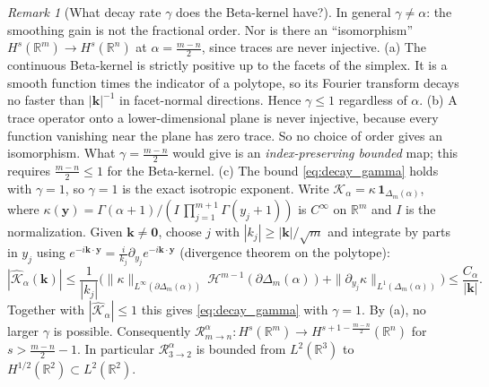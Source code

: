\documentclass[11pt,a4paper]{article}
\theoremstyle{plain}
\theoremstyle{definition}
\theoremstyle{remark}
\newtheorem{remark}[theorem]{Remark}
\numberwithin{equation}{section}
\begin{document}
\begin{remark}[What decay rate $\gamma$ does the Beta-kernel have?]
\label{rem:gamma}
In general $\gamma \neq \alpha$: the smoothing gain is not the fractional order. Nor is there an ``isomorphism'' $H^s(\mathbb{R}^m) \to H^s(\mathbb{R}^n)$ at $\alpha = \frac{m-n}{2}$, since traces are never injective.
(a) The continuous Beta-kernel is strictly positive up to the facets of the simplex. It is a smooth function times the indicator of a polytope, so its Fourier transform decays no faster than $|\mathbf{k}|^{-1}$ in facet-normal directions. Hence $\gamma \le 1$ regardless of $\alpha$.
(b) A trace operator onto a lower-dimensional plane is never injective, because every function vanishing near the plane has zero trace. So no choice of order gives an isomorphism. What $\gamma = \frac{m-n}{2}$ would give is an \emph{index-preserving bounded} map; this requires $\frac{m-n}{2} \le 1$ for the Beta-kernel.
(c) The bound \eqref{eq:decay_gamma} holds with $\gamma = 1$, so $\gamma = 1$ is the exact isotropic exponent. Write $\mathcal{K}_\alpha = \kappa\,\mathbf{1}_{\Delta_m(\alpha)}$, where $\kappa(\mathbf{y}) = \Gamma(\alpha+1)/(I\,\prod_{j=1}^{m+1}\Gamma(y_j+1))$ is $C^\infty$ on $\mathbb{R}^m$ and $I$ is the normalization. Given $\mathbf{k} \ne \mathbf{0}$, choose $j$ with $|k_j| \ge |\mathbf{k}|/\sqrt{m}$ and integrate by parts in $y_j$ using $e^{-i\mathbf{k}\cdot\mathbf{y}} = \frac{i}{k_j}\partial_{y_j}e^{-i\mathbf{k}\cdot\mathbf{y}}$ (divergence theorem on the polytope):
\[
|\widehat{\mathcal{K}}_\alpha(\mathbf{k})| \le \frac{1}{|k_j|}\Big( \|\kappa\|_{L^\infty(\partial\Delta_m(\alpha))}\, \mathcal{H}^{m-1}(\partial\Delta_m(\alpha)) + \|\partial_{y_j}\kappa\|_{L^1(\Delta_m(\alpha))} \Big) \le \frac{C_\alpha}{|\mathbf{k}|}.
\]
Together with $|\widehat{\mathcal{K}}_\alpha| \le 1$ this gives \eqref{eq:decay_gamma} with $\gamma = 1$. By (a), no larger $\gamma$ is possible. Consequently $\mathcal{R}^\alpha_{m \to n} \colon H^s(\mathbb{R}^m) \to H^{s + 1 - \frac{m-n}{2}}(\mathbb{R}^n)$ for $s > \frac{m-n}{2} - 1$. In particular $\mathcal{R}^\alpha_{3 \to 2}$ is bounded from $L^2(\mathbb{R}^3)$ to $H^{1/2}(\mathbb{R}^2) \subset L^2(\mathbb{R}^2)$.
\end{remark}
\end{document}
